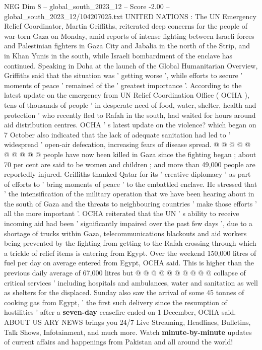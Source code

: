 \begin{textsample}{NEG Dim 8 – global\_south\_2023\_12 – Score -2.00 – global\_south\_2023\_12/104207025.txt}  \label{ex:f8_neg_010}
UNITED NATIONS : The UN Emergency Relief Coordinator, Martin Griffiths, reiterated deep concerns for the people of war-torn Gaza on Monday, amid reports of intense fighting between Israeli forces and Palestinian fighters in Gaza City and Jabalia in the north of the Strip, and in Khan Yunis in the south, while Israeli bombardment of the enclave has continued.
Speaking in Doha at the launch of the Global Humanitarian Overview, Griffiths said that the situation was ' getting worse ', while efforts to secure ' moments of peace ' remained of the ' greatest importance '.
According to the latest update on the emergency from UN Relief Coordination Office ( OCHA ), tens of thousands of people ' in desperate need of food, water, shelter, health and protection ' who recently fled to Rafah in the south, had waited for hours around aid distribution centres.
OCHA ' s latest update on the violence? which began on 7 October also indicated that the lack of adequate sanitation had led to ' widespread ' open-air defecation, increasing fears of disease spread. @ @ @ @ @ @ @ @ @ @ people have now been killed in Gaza since the fighting began ; about 70 per cent are said to be women and children ; and more than 49,000 people are reportedly injured.
Griffiths thanked Qatar for its ' creative diplomacy ' as part of efforts to ' bring moments of peace ' to the embattled enclave.
He stressed that ' the intensification of the military operation that we have been hearing about in the south of Gaza and the threats to neighbouring countries ' make those efforts ' all the more important '.
OCHA reiterated that the UN ' s ability to receive incoming aid had been ' significantly impaired over the past few days ', due to a shortage of trucks within Gaza, telecommunications blackouts and aid workers being prevented by the fighting from getting to the Rafah crossing through which a trickle of relief items is entering from Egypt.
Over the weekend 150,000 litres of fuel per day on average entered from Egypt, OCHA said.
This is higher than the previous daily average of 67,000 litres but @ @ @ @ @ @ @ @ @ @ collapse of critical services ' including hospitals and ambulances, water and sanitation as well as shelters for the displaced.
Sunday also saw the arrival of some 45 tonnes of cooking gas from Egypt, ' the first such delivery since the resumption of hostilities ' after a \textbf{seven-day} ceasefire ended on 1 December, OCHA said.
ABOUT US ARY NEWS brings you 24/7 Live Streaming, Headlines, Bulletins, Talk Shows, Infotainment, and much more.
Watch \textbf{minute-by-minute} updates of current affairs and happenings from Pakistan and all around the world!

\end{textsample}
